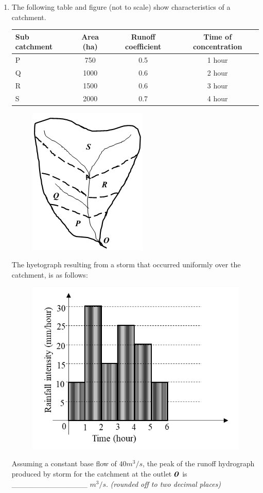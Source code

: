 \documentclass[journal]{IEEEtran}
\begin{document}
\begin{enumerate}[resume]
\item The following table and figure (not to scale) show characteristics of a catchment. \hfill{}

\begin{table}[H]
\centering
\begin{tabular}{|l|c|c|c|}
\hline
\textbf{Sub catchment} & \textbf{Area (ha)} & \textbf{Runoff coefficient} & \textbf{Time of concentration} \\
\hline
P & 750 & 0.5 & 1 hour \\
Q & 1000 & 0.6 & 2 hour \\
R & 1500 & 0.6 & 3 hour \\
S & 2000 & 0.7 & 4 hour \\
\hline
\end{tabular}
\end{table}
\begin{figure}[H]
    \centering
    \includegraphics[width=0.45\columnwidth]{figs/fig15.png}
\end{figure}
The hyetograph resulting from a storm that occurred uniformly over the catchment, is as follows:
\begin{figure}[H]
    \centering
    \includegraphics[width=0.45\columnwidth]{figs/fig16.png}
\end{figure}
Assuming a constant base flow of $40 m^3/s$, the peak of the runoff hydrograph produced by storm for the catchment at the outlet $\textbf{\textit{O}}$ is \_\_\_\_\_\_\_\_\_\_\_\_\_\_ $m^3/s$. \textit{(rounded off to two decimal places)}


\end{enumerate}
\end{document}
